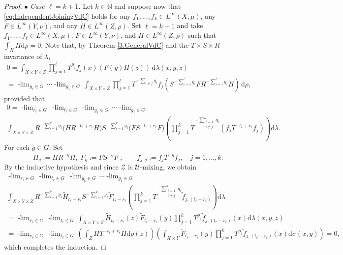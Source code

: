 \documentclass[10pt,a4paper]{amsart}
\newcommand{\N}{\mathbb{N}}
\newcommand{\plimgG}[3]{\mathop {#1\text{-lim}}_{#2\in #3}\,}
\begin{document}
\begin{proof}
$\bullet$ \textit{ Case $\ell=k+1$.} Let $k\in\N$ and suppose now that \eqref{eq:IndependentJoiningVdC} holds for any $\tilde f_1,...,\tilde f_k\in L^\infty(X,\mu)$, any $\tilde F\in L^\infty(Y,\nu)$, and any $\tilde H\in L^\infty(Z,\rho)$. 
Set $\ell=k+1$ and  take $f_1,...,f_\ell\in L^\infty(X,\mu)$, $F\in L^\infty(Y,\nu)$, and $H\in L^\infty(Z,\rho)$ such that $\int_X H\text{d}\rho=0$.
Note that, by Theorem \ref{3.GeneralVdC} and the $T\times S\times R$ invariance of $\lambda$, 
\begin{multline*}
0
=  \int_{X\times Y\times Z} \prod_{j=1}^\ell T^{p_j}f_j(x)(F(y)H(z))\,\text{d}\lambda(x,y,z)\\
= \plimgG{p_\ell}{g_\ell}{G}\cdots \plimgG{p_1}{g_1}{G} \int_{X\times Y\times Z}\prod_{j=1}^\ell T^{-\sum_{i\neq j}g_i}f_j(S^{-\sum_{i=1}^\ell g_i}FR^{-\sum_{i=1}^\ell g_i}H)\,\mathrm{d}\rho,
\end{multline*}
provided that
\begin{multline*}
0
= \plimgG{p_\ell}{r_\ell}{G}\plimgG{p_\ell}{t_\ell}{G} \plimgG{p_k}{g_k}{G}\cdots\plimgG{p_1}{g_1}{G} \\
\int_{X\times Y\times Z} R^{-\sum_{i=1}^k g_i}\Big(HR^{-t_\ell+r_\ell}H\Big)S^{-\sum_{i=1}^k g_i}\Big( FS^{-t_\ell+r_\ell}F\Big)
\left(\prod_{j=1}^kT^{-\sum_{\substack{i=1\\ i\neq j}}^k g_i}(f_jT^{-t_\ell+r_\ell}f_j)\right)\text{d}\lambda.
\end{multline*} 
For each $g\in G$, Set
\[
\tilde H_g:=HR^{-g}H,
\;\tilde F_g := F S^{-g}F\;,
\qquad
\tilde f_{j,g} := f_jT^{-g}f_j,\quad j=1,\dots,k.
\]
By the inductive hypothesis and since $\mathcal Z$ is $\mathcal U$-mixing, we obtain
\begin{multline*}
\plimgG{p_\ell}{r_\ell}{G}\plimgG{p_\ell}{t_\ell}{G}\plimgG{p_k}{g_k}{G}\cdots\plimgG{p_1}{g_1}{G}\\
\int_{X\times Y\times Z} R^{-\sum_{i=1}^k g_i}\tilde H_{t_\ell-r_\ell}S^{-\sum_{i=1}^kg_i}\tilde F_{t_\ell-r_\ell}\left(\prod_{j=1}^kT^{-\sum_{\substack{i=1\\ i\neq j}}^k g_i}\tilde f_{j,(t_\ell-r_\ell)}\right)\text{d}\lambda\\
= \plimgG{p_\ell}{r_\ell}{G}\plimgG{p_\ell}{t_\ell}{G}
\int_{X\times Y\times Z} \tilde H_{t_\ell-r_\ell}(z)\tilde F_{t_\ell-r_\ell}(y)\prod_{j=1}^kT^{p_j}\tilde f_{j,(t_\ell-r_\ell)}(x)\text{d}\lambda(x,y,z)\\
=\plimgG{p_\ell}{r_\ell}{G}\plimgG{p_\ell}{t_\ell}{G}
\left(\int_{Z} HT^{-t_\ell+r_\ell}H\text{d}\rho(z)\right)\left(\int_{X\times Y}\tilde F_{t_\ell-r_\ell}(y)\prod_{j=1}^kT^{p_j}\tilde f_{j,(t_\ell-r_\ell)}(x)\text{d}\sigma(x,y)\right)=0,
\end{multline*}
which completes the induction.
\end{proof}
\end{document}
